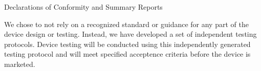 \newpage
{}
\singlespacing
\begin{center}
  \large{Declarations of Conformity and Summary Reports}
\end{center}

\onehalfspacing

We chose to not rely on a recognized standard or guidance for any part
of the device design or testing. Instead, we have developed a set of
independent testing protocols. Device testing will be conducted using
this independently generated testing protocol and will meet specified
acceptence criteria before the device is marketed. 

